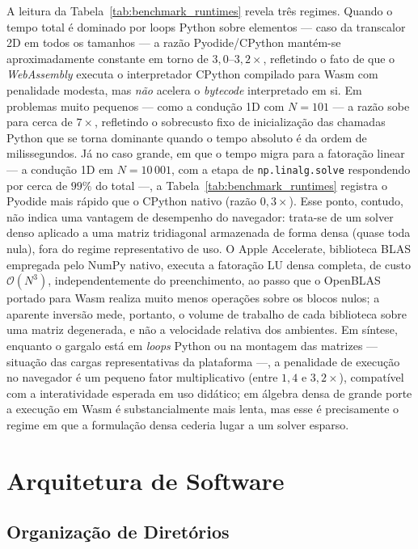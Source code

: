 A leitura da Tabela~\ref{tab:benchmark_runtimes} revela três regimes. Quando o tempo total é dominado por loops Python sobre elementos --- caso da transcalor 2D em todos os tamanhos --- a razão Pyodide/CPython mantém-se aproximadamente constante em torno de $3{,}0\text{--}3{,}2\times$, refletindo o fato de que o \textit{WebAssembly} executa o interpretador CPython compilado para Wasm com penalidade modesta, mas \emph{não} acelera o \textit{bytecode} interpretado em si. Em problemas muito pequenos --- como a condução 1D com $N = 101$ --- a razão sobe para cerca de $7\times$, refletindo o sobrecusto fixo de inicialização das chamadas Python que se torna dominante quando o tempo absoluto é da ordem de milissegundos. Já no caso grande, em que o tempo migra para a fatoração linear --- a condução 1D em $N = 10\,001$, com a etapa de \texttt{np.linalg.solve} respondendo por cerca de $99\%$ do total ---, a Tabela~\ref{tab:benchmark_runtimes} registra o Pyodide mais rápido que o CPython nativo (razão $0{,}3\times$). Esse ponto, contudo, não indica uma vantagem de desempenho do navegador: trata-se de um solver denso aplicado a uma matriz tridiagonal armazenada de forma densa (quase toda nula), fora do regime representativo de uso. O Apple Accelerate, biblioteca BLAS empregada pelo NumPy nativo, executa a fatoração LU densa completa, de custo $\mathcal{O}(N^3)$, independentemente do preenchimento, ao passo que o OpenBLAS portado para Wasm realiza muito menos operações sobre os blocos nulos; a aparente inversão mede, portanto, o volume de trabalho de cada biblioteca sobre uma matriz degenerada, e não a velocidade relativa dos ambientes. Em síntese, enquanto o gargalo está em \emph{loops} Python ou na montagem das matrizes --- situação das cargas representativas da plataforma ---, a penalidade de execução no navegador é um pequeno fator multiplicativo (entre $1{,}4$ e $3{,}2\times$), compatível com a interatividade esperada em uso didático; em álgebra densa de grande porte a execução em Wasm é substancialmente mais lenta, mas esse é precisamente o regime em que a formulação densa cederia lugar a um solver esparso.

\section{Arquitetura de Software}
\label{sec:arquitetura_software}

\subsection{Organização de Diretórios}
\label{sec:organizacao_diretorios}

